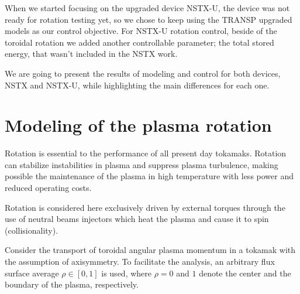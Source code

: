 \documentclass[12pt,lot, lof]{puthesis}
\begin{document}
When we started focusing on the upgraded device NSTX-U, the device was not ready for rotation testing yet, so we chose to keep using the TRANSP upgraded models as our control objective.
For NSTX-U rotation control, beside of the toroidal rotation we added another controllable parameter; the total stored energy, that wasn't included in the NSTX work. 

We are going to present the results of modeling and control for both devices, NSTX and NSTX-U, while highlighting the main differences for each one.

\section{Modeling of the plasma rotation}

Rotation is essential to the performance of all present day tokamaks. Rotation can stabilize instabilities in plasma and suppress plasma turbulence, making possible the maintenance of the plasma in high temperature with less power and reduced operating costs. 

Rotation is considered here exclusively driven by external torques through the use of neutral beams injectors which heat the plasma and cause it to spin (collisionality).

Consider the transport of toroidal angular plasma momentum in a tokamak with the assumption of axisymmetry.  To facilitate the analysis, an arbitrary flux surface average $\rho \in [0,1]$ is used, where $\rho = 0$ and $1$ denote the center and the boundary of the plasma, respectively.  
\end{document}
